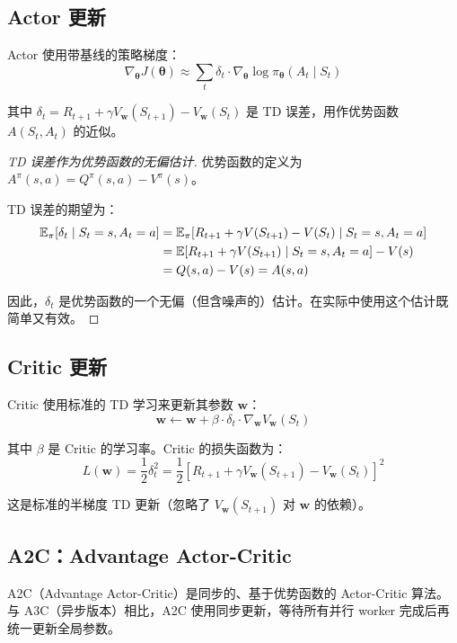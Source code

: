 \subsection{Actor 更新}

Actor 使用带基线的策略梯度：
$$\nabla_{\boldsymbol{\theta}} J(\boldsymbol{\theta}) \approx \sum_t \delta_t \cdot \nabla_{\boldsymbol{\theta}} \log \pi_{\boldsymbol{\theta}}(A_t \mid S_t)$$

其中 $\delta_t = R_{t+1} + \gamma V_{\mathbf{w}}(S_{t+1}) - V_{\mathbf{w}}(S_t)$ 是 TD 误差，用作优势函数 $A(S_t, A_t)$ 的近似。

\begin{proof}[TD 误差作为优势函数的无偏估计]
优势函数的定义为 $A^{\pi}(s,a) = Q^{\pi}(s,a) - V^{\pi}(s)$。

TD 误差的期望为：
\begin{align*}
\mathbb{E}_{\pi}[\delta_t \mid S_t = s, A_t = a] &= \mathbb{E}_{\pi}[R_{t+1} + \gamma V(S_{t+1}) - V(S_t) \mid S_t = s, A_t = a] \\
&= \mathbb{E}[R_{t+1} + \gamma V(S_{t+1}) \mid S_t = s, A_t = a] - V(s) \\
&= Q(s,a) - V(s) = A(s,a)
\end{align*}

因此，$\delta_t$ 是优势函数的一个无偏（但含噪声的）估计。在实际中使用这个估计既简单又有效。
\end{proof}

\subsection{Critic 更新}

Critic 使用标准的 TD 学习来更新其参数 $\mathbf{w}$：
$$\mathbf{w} \leftarrow \mathbf{w} + \beta \cdot \delta_t \cdot \nabla_{\mathbf{w}} V_{\mathbf{w}}(S_t)$$

其中 $\beta$ 是 Critic 的学习率。Critic 的损失函数为：
$$L(\mathbf{w}) = \frac{1}{2}\delta_t^2 = \frac{1}{2}[R_{t+1} + \gamma V_{\mathbf{w}}(S_{t+1}) - V_{\mathbf{w}}(S_t)]^2$$

这是标准的半梯度 TD 更新（忽略了 $V_{\mathbf{w}}(S_{t+1})$ 对 $\mathbf{w}$ 的依赖）。

\subsection{A2C：Advantage Actor-Critic}

A2C（Advantage Actor-Critic）是同步的、基于优势函数的 Actor-Critic 算法。与 A3C（异步版本）相比，A2C 使用同步更新，等待所有并行 worker 完成后再统一更新全局参数。

